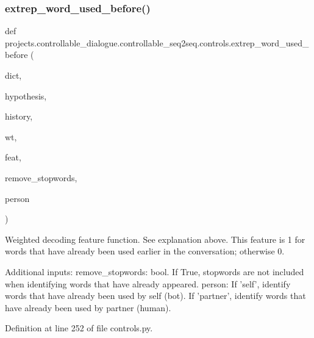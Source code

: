 \mbox{\label{namespaceprojects_1_1controllable__dialogue_1_1controllable__seq2seq_1_1controls_a1d20bea2946cab3a79aa8a2e77f9e09b}} 
\subsubsection{\texorpdfstring{extrep\+\_\+word\+\_\+used\+\_\+before()}{extrep\_word\_used\_before()}}
{\footnotesize\ttfamily def projects.\+controllable\+\_\+dialogue.\+controllable\+\_\+seq2seq.\+controls.\+extrep\+\_\+word\+\_\+used\+\_\+before (\begin{DoxyParamCaption}\item[{}]{dict,  }\item[{}]{hypothesis,  }\item[{}]{history,  }\item[{}]{wt,  }\item[{}]{feat,  }\item[{}]{remove\+\_\+stopwords,  }\item[{}]{person }\end{DoxyParamCaption})}

\begin{DoxyVerb}Weighted decoding feature function. See explanation above. This feature is 1 for
words that have already been used earlier in the conversation; otherwise 0.

Additional inputs:
  remove_stopwords: bool. If True, stopwords are not included when identifying words
    that have already appeared.
  person: If 'self', identify words that have already been used by self (bot).
    If 'partner', identify words that have already been used by partner (human).
\end{DoxyVerb}
 

Definition at line 252 of file controls.\+py.


